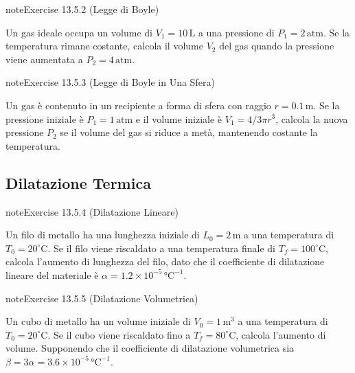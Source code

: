 \documentclass[letterpaper,10pt,italian]{jupyterBook}
\begin{document}
\begin{sphinxadmonition}{note}{Exercise 13.5.2 (Legge di Boyle)}



\sphinxAtStartPar
Un gas ideale occupa un volume di \(V_1 = 10 \, \text{L}\) a una pressione di \(P_1 = 2 \, \text{atm}\). Se la temperatura rimane costante, calcola il volume \(V_2\) del gas quando la pressione viene aumentata a \(P_2 = 4 \, \text{atm}\).
\end{sphinxadmonition}
 \label{exercise:ch/thermodynamics/foundation-problems-exercise-2}

\begin{sphinxadmonition}{note}{Exercise 13.5.3 (Legge di Boyle in Una Sfera)}



\sphinxAtStartPar
Un gas è contenuto in un recipiente a forma di sfera con raggio \(r = 0.1 \, \text{m}\). Se la pressione iniziale è \(P_1 = 1 \, \text{atm}\) e il volume iniziale è \(V_1 = 4/3 \pi r^3\), calcola la nuova pressione \(P_2\) se il volume del gas si riduce a metà, mantenendo costante la temperatura.
\end{sphinxadmonition}


\subsection{Dilatazione Termica}
\label{\detokenize{ch/thermodynamics/foundation-problems:dilatazione-termica}} \label{exercise:ch/thermodynamics/foundation-problems-exercise-3}

\begin{sphinxadmonition}{note}{Exercise 13.5.4 (Dilatazione Lineare)}



\sphinxAtStartPar
Un filo di metallo ha una lunghezza iniziale di \(L_0 = 2 \, \text{m}\) a una temperatura di \(T_0 = 20^\circ \text{C}\). Se il filo viene riscaldato a una temperatura finale di \(T_f = 100^\circ \text{C}\), calcola l’aumento di lunghezza del filo, dato che il coefficiente di dilatazione lineare del materiale è \(\alpha = 1.2 \times 10^{-5} \, \text{°C}^{-1}\).
\end{sphinxadmonition}
 \label{exercise:ch/thermodynamics/foundation-problems-exercise-4}

\begin{sphinxadmonition}{note}{Exercise 13.5.5 (Dilatazione Volumetrica)}



\sphinxAtStartPar
Un cubo di metallo ha un volume iniziale di \(V_0 = 1 \, \text{m}^3\) a una temperatura di \(T_0 = 20^\circ \text{C}\). Se il cubo viene riscaldato fino a \(T_f = 80^\circ \text{C}\), calcola l’aumento di volume. Supponendo che il coefficiente di dilatazione volumetrica sia \(\beta = 3 \alpha = 3.6 \times 10^{-5} \, \text{°C}^{-1}\).
\end{sphinxadmonition}
 \label{exercise:ch/thermodynamics/foundation-problems-exercise-5}
\end{document}
